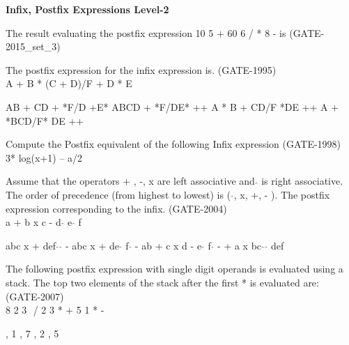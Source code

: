 
\centerline{\textbf{ \LARGE Infix, Postfix Expressions Level-2}}


\begin{questyle}
  \question  The result evaluating the postfix expression 10 5 + 60 6 / * 8 -  is  (GATE-2015\_set\_3)

  \begin{choices}
  \end{choices}
\end{questyle}


\begin{questyle}
  \question  The postfix expression for the infix expression is.  (GATE-1995)\\
              A + B * (C + D)/F + D * E

  \begin{choices}
    \choice         AB + CD + *F/D +E*
    \CorrectChoice  ABCD + *F/DE* ++
    \choice         A * B + CD/F *DE ++
    \choice         A + *BCD/F* DE ++
  \end{choices}
\end{questyle}


\begin{questyle}
  \question  Compute the Postfix equivalent of the following Infix expression \fillin[]  (GATE-1998) \\
              3* log(x+1) – a/2

\end{questyle}


\begin{questyle}
  \question   Assume that the operators + , -, x are left associative and \( \hat{} \) is right associative. The order of
              precedence (from highest to lowest) is (  \( \hat{} \), x, +, - ). The postfix expression corresponding to the infix. (GATE-2004) \\
              a + b x c - d \( \hat{} \) e \( \hat{} \) f

  \begin{choices}
    \CorrectChoice  abc x + def \( \hat{} \) \( \hat{} \) -
    \choice         abc x + de \( \hat{} \) f \( \hat{} \) -
    \choice         ab + c x d - e \( \hat{} \) f  \( \hat{} \)
    \choice         - + a x bc \( \hat{} \) \( \hat{} \) def
  \end{choices}
\end{questyle}



\begin{questyle}
  \question  The following postfix expression with single digit operands is evaluated using a stack.
             The top two elements of the stack after the first * is evaluated are: (GATE-2007) \\
             8 2 3 \( \hat{} \)  / 2 3 * + 5 1 * -

  \begin{choices}
    , 1
    , 7
    , 2
    , 5
  \end{choices}
\end{questyle}



